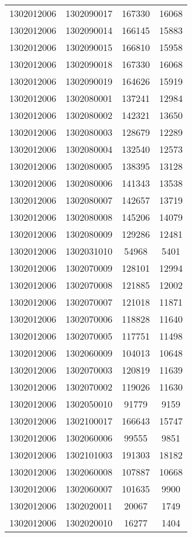 \begin{longtable}[h]{llcc}
		1302012006 & 1302090017 & 167330 & 16068\\
		1302012006 & 1302090014 & 166145 & 15883\\
		1302012006 & 1302090015 & 166810 & 15958\\
		1302012006 & 1302090018 & 167330 & 16068\\
		1302012006 & 1302090019 & 164626 & 15919\\
		1302012006 & 1302080001 & 137241 & 12984\\
		1302012006 & 1302080002 & 142321 & 13650\\
		1302012006 & 1302080003 & 128679 & 12289\\
		1302012006 & 1302080004 & 132540 & 12573\\
		1302012006 & 1302080005 & 138395 & 13128\\
		1302012006 & 1302080006 & 141343 & 13538\\
		1302012006 & 1302080007 & 142657 & 13719\\
		1302012006 & 1302080008 & 145206 & 14079\\
		1302012006 & 1302080009 & 129286 & 12481\\
		1302012006 & 1302031010 & 54968 & 5401\\
		1302012006 & 1302070009 & 128101 & 12994\\
		1302012006 & 1302070008 & 121885 & 12002\\
		1302012006 & 1302070007 & 121018 & 11871\\
		1302012006 & 1302070006 & 118828 & 11640\\
		1302012006 & 1302070005 & 117751 & 11498\\
		1302012006 & 1302060009 & 104013 & 10648\\
		1302012006 & 1302070003 & 120819 & 11639\\
		1302012006 & 1302070002 & 119026 & 11630\\
		1302012006 & 1302050010 & 91779 & 9159\\
		1302012006 & 1302100017 & 166643 & 15747\\
		1302012006 & 1302060006 & 99555 & 9851\\
		1302012006 & 1302101003 & 191303 & 18182\\
		1302012006 & 1302060008 & 107887 & 10668\\
		1302012006 & 1302060007 & 101635 & 9900\\
		1302012006 & 1302020011 & 20067 & 1749\\
		1302012006 & 1302020010 & 16277 & 1404\\

\end{longtable}
